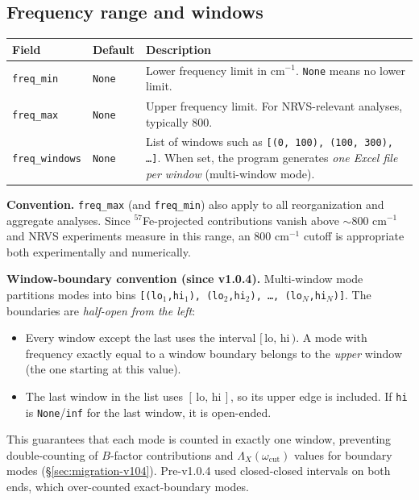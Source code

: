 \documentclass[11pt,a4paper,twoside]{article}
\theoremstyle{remark}
\begin{document}
\subsection{Frequency range and windows}

\begin{longtable}{p{} p{} p{}}
\toprule
\textbf{Field} & \textbf{Default} & \textbf{Description} \\
\midrule
\endhead
\texttt{freq\_min}      & \texttt{None} & Lower frequency limit in
  cm$^{-1}$. \texttt{None} means no lower limit. \\
\texttt{freq\_max}      & \texttt{None} & Upper frequency limit.
  For NRVS-relevant analyses, typically 800. \\
\texttt{freq\_windows}  & \texttt{None} & List of windows such as
  \texttt{[(0, 100), (100, 300), \ldots]}. When set, the program
  generates \emph{one Excel file per window} (multi-window mode). \\
\bottomrule
\end{longtable}

\begin{infobox}
\textbf{Convention.} \texttt{freq\_max} (and \texttt{freq\_min})
also apply to all reorganization and aggregate analyses. Since
$^{57}$Fe-projected contributions vanish above $\sim$800 cm$^{-1}$
and NRVS experiments measure in this range, an 800 cm$^{-1}$
cutoff is appropriate both experimentally and numerically.
\end{infobox}

\begin{infobox}
\textbf{Window-boundary convention (since v1.0.4).}
Multi-window mode partitions modes into bins
\texttt{[(lo$_1$,hi$_1$), (lo$_2$,hi$_2$), \ldots, (lo$_N$,hi$_N$)]}.
The boundaries are \emph{half-open from the left}:
\begin{itemize}\setlength{\itemsep}{0pt}
  \item Every window except the last uses the interval
        $[\,\text{lo},\, \text{hi}\,)$. A mode with frequency
        exactly equal to a window boundary belongs to the
        \emph{upper} window (the one starting at this value).
  \item The last window in the list uses
        $[\,\text{lo},\, \text{hi}\,]$, so its upper edge is
        included.  If \texttt{hi} is \texttt{None}/\texttt{inf}
        for the last window, it is open-ended.
\end{itemize}
This guarantees that each mode is counted in exactly one window,
preventing double-counting of $B$-factor contributions and
$\Lambda_X(\omega_\text{cut})$ values for boundary modes
(\S\ref{sec:migration-v104}).  Pre-v1.0.4 used closed-closed
intervals on both ends, which over-counted exact-boundary modes.
\end{infobox}
\end{document}
